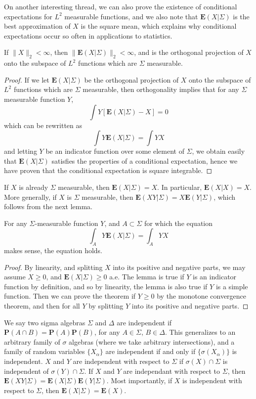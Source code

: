 On another interesting thread, we can also prove the existence of conditional expectations for $L^2$ measurable functions, and we also note that $\mathbf{E}(X|\Sigma)$ is the best approximation of $X$ is the square mean, which explains why conditional expectations occur so often in applications to statistics.

\begin{theorem}
    If $\| X \|_2 < \infty$, then $\| \mathbf{E}(X|\Sigma) \|_2 < \infty$, and is the orthogonal projection of $X$ onto the subspace of $L^2$ functions which are $\Sigma$ measurable.
\end{theorem}
\begin{proof}
    If we let $\mathbf{E}(X|\Sigma)$ be the orthogonal projection of $X$ onto the subspace of $L^2$ functions which are $\Sigma$ measurable, then orthogonality implies that for any $\Sigma$ measurable function $Y$,
    \[ \int Y[\mathbf{E}(X|\Sigma) - X] = 0 \]
    which can be rewritten as
    \[ \int Y \mathbf{E}(X|\Sigma) = \int YX \]
    and letting $Y$ be an indicator function over some element of $\Sigma$, we obtain easily that $\mathbf{E}(X|\Sigma)$ satisfies the properties of a conditional expectation, hence we have proven that the conditional expectation is square integrable.
\end{proof}

If $X$ is already $\Sigma$ measurable, then $\mathbf{E}(X|\Sigma) = X$. In particular, $\mathbf{E}(X|X) = X$. More generally, if $X$ is $\Sigma$ measurable, then $\mathbf{E}(XY|\Sigma) = X\mathbf{E}(Y|\Sigma)$, which follows from the next lemma.

\begin{lemma}
    For any $\Sigma$-measurable function $Y$, and $A \subset \Sigma$ for which the equation
    \[ \int_A Y \mathbf{E}(X|\Sigma) = \int_A YX \]
    makes sense, the equation holds.
\end{lemma}
\begin{proof}
    By linearity, and splitting $X$ into its positive and negative parts, we may assume $X \geq 0$, and $\mathbf{E}(X|\Sigma) \geq 0$ a.e. The lemma is true if $Y$ is an indicator function by definition, and so by linearity, the lemma is also true if $Y$ is a simple function. Then we can prove the theorem if $Y \geq 0$ by the monotone convergence theorem, and then for all $Y$ by splitting $Y$ into its positive and negative parts.
\end{proof}

We say two sigma algebras $\Sigma$ and $\Delta$ are independent if $\mathbf{P}(A \cap B) = \mathbf{P}(A) \mathbf{P}(B)$, for any $A \in \Sigma$, $B \in \Delta$. This generalizes to an arbitrary family of $\sigma$ algebras (where we take arbitrary intersections), and a family of random variables $\{ X_\alpha \}$ are independent if and only if $\{ \sigma(X_\alpha) \}$ is independent. $X$ and $Y$ are independent with respect to $\Sigma$ if $\sigma(X) \cap \Sigma$ is independent of $\sigma(Y) \cap \Sigma$. If $X$ and $Y$ are independant with respect to $\Sigma$, then $\mathbf{E}(XY | \Sigma) = \mathbf{E}(X|\Sigma) \mathbf{E}(Y|\Sigma)$. Most importantly, if $X$ is independent with respect to $\Sigma$, then $\mathbf{E}(X|\Sigma) = \mathbf{E}(X)$.

